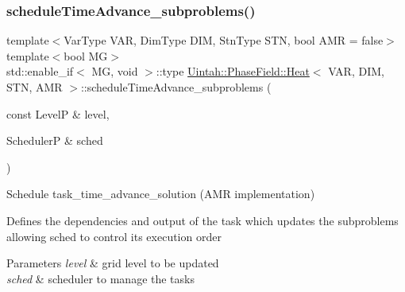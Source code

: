 \subsubsection{\texorpdfstring{schedule\+Time\+Advance\+\_\+subproblems()}{scheduleTimeAdvance\_subproblems()}\hspace{0.1cm}{\footnotesize\ttfamily [2/2]}}
{\footnotesize\ttfamily template$<$Var\+Type V\+AR, Dim\+Type D\+IM, Stn\+Type S\+TN, bool A\+MR = false$>$ \\
template$<$bool MG$>$ \\
std\+::enable\+\_\+if$<$ MG, void $>$\+::type \hyperlink{classUintah_1_1PhaseField_1_1Heat}{Uintah\+::\+Phase\+Field\+::\+Heat}$<$ V\+AR, D\+IM, S\+TN, A\+MR $>$\+::schedule\+Time\+Advance\+\_\+subproblems (\begin{DoxyParamCaption}\item[{const LevelP \&}]{level,  }\item[{SchedulerP \&}]{sched }\end{DoxyParamCaption})\hspace{0.3cm}{\ttfamily [protected]}}



Schedule task\+\_\+time\+\_\+advance\+\_\+solution (A\+MR implementation) 

Defines the dependencies and output of the task which updates the subproblems allowing sched to control its execution order


\begin{DoxyParams}{Parameters}
{\em level} & grid level to be updated \\
\hline
{\em sched} & scheduler to manage the tasks \\
\hline
\end{DoxyParams}
\mbox{\label{classUintah_1_1PhaseField_1_1Heat_a73770e2d2271bbab30b3b67462c32a1c}} 
